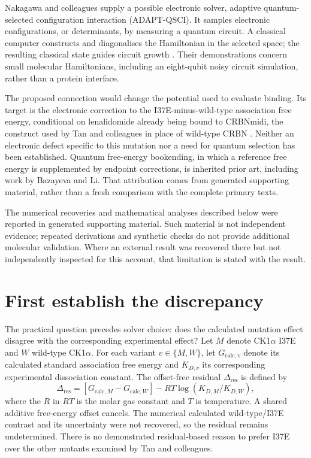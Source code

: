 \documentclass{article}
\begin{document}
Nakagawa and colleagues supply a possible electronic solver, adaptive quantum-selected configuration interaction (ADAPT-QSCI). It samples electronic configurations, or determinants, by measuring a quantum circuit. A classical computer constructs and diagonalises the Hamiltonian in the selected space; the resulting classical state guides circuit growth \cite{P}. Their demonstrations concern small molecular Hamiltonians, including an eight-qubit noisy circuit simulation, rather than a protein interface.

The proposed connection would change the potential used to evaluate binding. Its target is the electronic correction to the I37E-minus-wild-type association free energy, conditional on lenalidomide already being bound to CRBNmidi, the construct used by Tan and colleagues in place of wild-type CRBN \cite{Q}. Neither an electronic defect specific to this mutation nor a need for quantum selection has been established. Quantum free-energy bookending, in which a reference free energy is supplemented by endpoint corrections, is inherited prior art, including work by Bazayeva and Li. That attribution comes from generated supporting material, rather than a fresh comparison with the complete primary texts.

The numerical recoveries and mathematical analyses described below were reported in generated supporting material. Such material is not independent evidence; repeated derivations and synthetic checks do not provide additional molecular validation. Where an external result was recovered there but not independently inspected for this account, that limitation is stated with the result.

\section{First establish the discrepancy}

The practical question precedes solver choice: does the calculated mutation effect disagree with the corresponding experimental effect? Let \(M\) denote CK1\(\alpha\) I37E and \(W\) wild-type CK1\(\alpha\). For each variant \(v\in\{M,W\}\), let \(G_{\mathrm{calc},v}\) denote its calculated standard association free energy and \(K_{D,v}\) its corresponding experimental dissociation constant. The offset-free residual \(\Delta_{\mathrm{res}}\) is defined by
\[
\Delta_{\mathrm{res}}=[G_{\mathrm{calc},M}-G_{\mathrm{calc},W}]
  -RT\log(K_{D,M}/K_{D,W}),
\]
where the \(R\) in \(RT\) is the molar gas constant and \(T\) is temperature. A shared additive free-energy offset cancels. The numerical calculated wild-type/I37E contrast and its uncertainty were not recovered, so the residual remains undetermined. There is no demonstrated residual-based reason to prefer I37E over the other mutants examined by Tan and colleagues.
\end{document}
